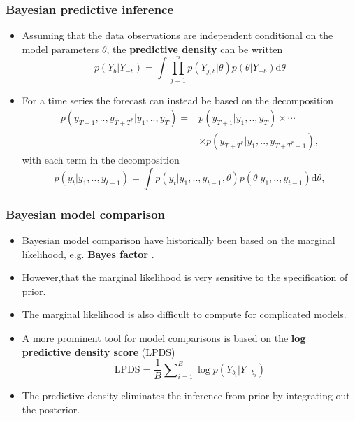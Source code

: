 \documentclass[11pt]{beamer}
\begin{document}
\begin{frame}
  \frametitle{Bayesian predictive inference}
  \begin{itemize}
  \item Assuming that the data observations are independent conditional on the
    model parameters $\theta$, the \textbf{predictive density} can be written
    \[
    p(Y_{b}|Y_{-b})=\int\prod_{j=1}^{n}p(Y_{j,b}|\theta)p(\theta|Y_{-b})\mathrm{d}\theta
    \]

  \item For a time series the forecast can instead be based on the
    decomposition
    \[
    \begin{split}
      p(y_{T+1},..,y_{T+T^{\ast}}|y_{1},..,y_{T})=&p(y_{T+1}|y_{1},..,y_{T})\times
      \cdots\\
      &\times p(y_{T+T^{\ast}}|y_{1},..,y_{T+T^{\ast}-1}),
    \end{split}
    \]
    with each term in the decomposition
    \[ p(y_{t}|y_{1},..,y_{t-1})=\int
    p(y_{t}|y_{1},..,y_{t-1},\theta)p(\theta|y_{1},..,y_{t-1})\mathrm{d}\theta,\]



  \end{itemize}

\end{frame}

\begin{frame}
  \frametitle{Bayesian model comparison}

  \begin{itemize}
  \item Bayesian model comparison have historically been based on the
    marginal likelihood, e.g. \textbf{Bayes factor} \citep{kass1995bayes}.

  \item However,that the marginal likelihood is very sensitive to the
    specification of prior.

  \item The marginal likelihood is also difficult to compute for
    complicated models.

  \item A more prominent tool for model comparisons is based on the \textbf{log
      predictive density score} (LPDS)
    \[
    \mathrm{LPDS}=\frac{1}{B}\sum\nolimits _{i=1}^{B}\log p(Y_{b_{i}}|Y_{-b_{i}})
    \]

  \item The predictive density eliminates the inference from prior by
    integrating out the posterior.



  \end{itemize}

\end{frame}
\end{document}
